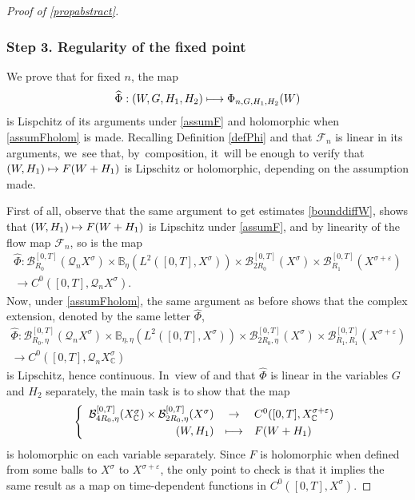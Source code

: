 \documentclass[11pt]{article}
\providecommand{\dpl}{\displaystyle}
\newcommand\mto{\mathchoice{\longmapsto}{\mapsto}{\mapsto}{\mapsto}}
\theoremstyle{definition}
\let\mc\mathcal
\let\veps\varepsilon
\newcommand{\B}{\mc{B}}
\newcommand{\Q}{\mathcal{Q}}
\newcommand\FL{\mathcal{F}_{n}}
\begin{document}
\begin{proof}[Proof of \cref{propabstract}]
\subsubsection*{Step 3. Regularity of the fixed point} We prove that for fixed $n$, the map
\[
\widehat{\Phi}: (W, G, H_1, H_2)\mto \Phi_{n, G, H_1, H_2}(W)
\]
is Lispchitz of its arguments under \cref{assumF} and holomorphic when \cref{assumFholom} is made.
Recalling Definition \eqref{defPhi} and that $\FL$ is linear in its arguments, we~see that, by~composition, it~will be enough to verify that $(W,H_1)\mto F(W+H_{1})$ is Lipschitz or holomorphic, depending on the assumption made.

First of all, observe that the same argument to get estimates \eqref{bounddiffW}, shows that $(W,H_1)\mto F(W+H_{1})$ is Lipschitz under \cref{assumF}, and by linearity of the flow map $\mc{F}_n$, so is the map
\begin{multline*}
\widehat{\Phi}: \B_{R_0}^{[0, T]}(\Q_n X^{\sigma})\times \mathbb{B}_{\eta}(L^{2}([0,T],X^{\sigma}))\times \B_{2R_{0}}^{[0,T]}(X^{\sigma}) \times \B_{R_{1}}^{[0,T]}(X^{\sigma+\veps})\\
\to C^0([0, T], \Q_{n }X^{\sigma}).
\end{multline*}
Now, under \cref{assumFholom}, the same argument as before shows that the complex extension, denoted by the same letter $\widehat{\Phi}$,
\begin{multline*}
\widehat{\Phi}: \B_{R_0, \eta}^{[0, T]}(\Q_n X^{\sigma})\times \mathbb{B}_{\eta,\eta}(L^{2}([0,T],X^{\sigma}))\times \B_{2R_{0},\eta}^{[0,T]}(X^{\sigma}) \times \B_{R_{1}, R_{1}}^{[0,T]}(X^{\sigma+\veps})\\ \to C^0([0, T], \Q_{n }X_\mathbb{C}^{\sigma})
\end{multline*}
is Lipschitz, hence continuous. In~view of \cite[Prop.\,8.10]{Muj86} and that $\widehat{\Phi}$ is linear in the variables $G$ and $H_2$ separately, the main task is to show that the map
\begin{align}
\left\{\begin{array}{rcl}
\B_{4R_{0}, \eta}^{[0,T]}(X_{\mathbb{C}}^{\sigma}) \times \B_{2R_{0}, \eta}^{[0,T]}(X^{\sigma}) & \dpl\to& C^0([0, T], X_\mathbb{C}^{\sigma+\veps})\\[3pt]
(W, H_1 )&\dpl\mto& F(W+H_1)
\end{array}\right.
\end{align}
is holomorphic on each variable separately. Since $F$ is holomorphic when defined from some balls to $X^\sigma$ to $X^{\sigma+\veps}$, the only point to check is that it implies the same result as a map on time-dependent functions in $C^0([0,T],X^\sigma)$.


\end{proof}
\end{document}
